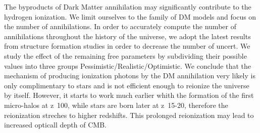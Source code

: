 The byproducts of Dark Matter annihilation may significantly contribute to the hydrogen ionization. We limit ourselves to the family of DM models and focus on the number of annihilations. In order to accurately compute the number of annihilations throughout the history of the universe, we adopt the latest results from structure formation studies in order to decrease the number of uncert. We study the effect of the remaining free parameters by subdividing their possible values into three groups Pessimistic/Realistic/Optimistic. We conclude that the mechanism of producing ionization photons by the DM annihilation very likely is only complimentary to stars and is not efficient enough to reionize the universe by itself. However, it starts to work much earlier whith the formation of the first micro-halos at z~100, while stars are born later at z~15-20, therefore the reionization streches to higher redshifts. This prolonged reionization may lead to increased opticall depth of CMB.